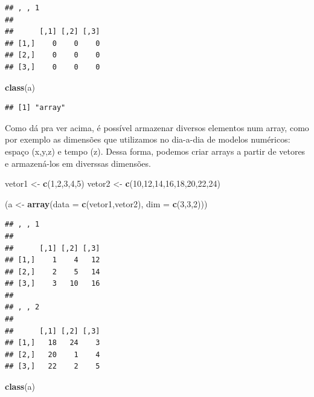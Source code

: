 \documentclass[]{book}
\newenvironment{Shaded}{\begin{snugshade}}{\end{snugshade}}
\newcommand{\KeywordTok}[1]{\textcolor[rgb]{0.13,0.29,0.53}{\textbf{#1}}}
\newcommand{\DataTypeTok}[1]{\textcolor[rgb]{0.13,0.29,0.53}{#1}}
\newcommand{\DecValTok}[1]{\textcolor[rgb]{0.00,0.00,0.81}{#1}}
\newcommand{\StringTok}[1]{\textcolor[rgb]{0.31,0.60,0.02}{#1}}
\newcommand{\NormalTok}[1]{#1}
\theoremstyle{definition}
\theoremstyle{definition}
\theoremstyle{definition}
\theoremstyle{remark}
\begin{document}
\begin{verbatim}
## , , 1
## 
##      [,1] [,2] [,3]
## [1,]    0    0    0
## [2,]    0    0    0
## [3,]    0    0    0
\end{verbatim}

\begin{Shaded}
\begin{Highlighting}[]
\KeywordTok{class}\NormalTok{(a)}
\end{Highlighting}
\end{Shaded}

\begin{verbatim}
## [1] "array"
\end{verbatim}

Como dá pra ver acima, é possível armazenar diversos elementos num
array, como por exemplo as dimensões que utilizamos no dia-a-dia de
modelos numéricos: espaço (x,y,z) e tempo (z). Dessa forma, podemos
criar arrays a partir de vetores e armazená-los em diverssas dimensões.

\begin{Shaded}
\begin{Highlighting}[]
\NormalTok{vetor1 <-}\StringTok{ }\KeywordTok{c}\NormalTok{(}\DecValTok{1}\NormalTok{,}\DecValTok{2}\NormalTok{,}\DecValTok{3}\NormalTok{,}\DecValTok{4}\NormalTok{,}\DecValTok{5}\NormalTok{)}
\NormalTok{vetor2 <-}\StringTok{ }\KeywordTok{c}\NormalTok{(}\DecValTok{10}\NormalTok{,}\DecValTok{12}\NormalTok{,}\DecValTok{14}\NormalTok{,}\DecValTok{16}\NormalTok{,}\DecValTok{18}\NormalTok{,}\DecValTok{20}\NormalTok{,}\DecValTok{22}\NormalTok{,}\DecValTok{24}\NormalTok{)}

\NormalTok{(a <-}\StringTok{ }\KeywordTok{array}\NormalTok{(}\DataTypeTok{data =} \KeywordTok{c}\NormalTok{(vetor1,vetor2), }\DataTypeTok{dim =} \KeywordTok{c}\NormalTok{(}\DecValTok{3}\NormalTok{,}\DecValTok{3}\NormalTok{,}\DecValTok{2}\NormalTok{)))}
\end{Highlighting}
\end{Shaded}

\begin{verbatim}
## , , 1
## 
##      [,1] [,2] [,3]
## [1,]    1    4   12
## [2,]    2    5   14
## [3,]    3   10   16
## 
## , , 2
## 
##      [,1] [,2] [,3]
## [1,]   18   24    3
## [2,]   20    1    4
## [3,]   22    2    5
\end{verbatim}

\begin{Shaded}
\begin{Highlighting}[]
\KeywordTok{class}\NormalTok{(a)}
\end{Highlighting}
\end{Shaded}
\end{document}
